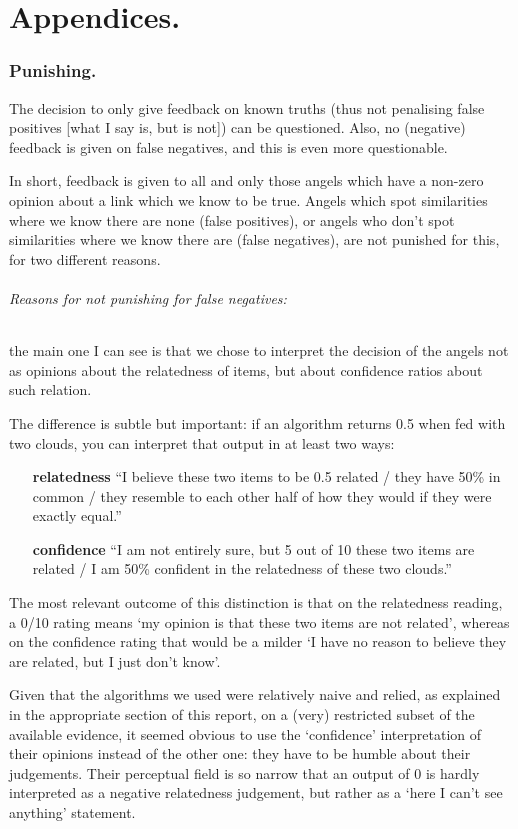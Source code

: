 \documentclass[11pt]{article}
\begin{document}
\part{Appendices.}
\section{Punishing.}

The decision to only give feedback on known truths (thus not penalising false positives [what I say is, but is not]) can be questioned. Also, no (negative) feedback is given on false negatives, and this is even more questionable.

In short, feedback is given to all and only those angels which have a non-zero opinion about a link which we know to be true. Angels which spot similarities where we know there are none (false positives), or angels who don't spot similarities where we know there are (false negatives), are not punished for this, for two different reasons.

\paragraph{Reasons for not punishing for false negatives:} the main one I can see is that we chose to interpret the decision of the angels not as opinions about the relatedness of items, but about confidence ratios about such relation.

The difference is subtle but important: if an algorithm returns 0.5 when fed with two clouds, you can interpret that output in at least two ways:

\begin{itemize}
\item[\textbf{relatedness}] ``I believe these two items to be 0.5 related / they have 50\% in common / they resemble to each other half of how they would if they were exactly equal.''
\item[\textbf{confidence}] ``I am not entirely sure, but 5 out of 10 these two items are related / I am 50\% confident in the relatedness of these two clouds.''
\end{itemize}

The most relevant outcome of this distinction is that on the relatedness reading, a 0/10 rating means `my opinion is that these two items are not related', whereas on the confidence rating that would be a milder `I have no reason to believe they are related, but I just don't know'.

Given that the algorithms we used were relatively naive and relied, as explained in the appropriate section of this report, on a (very) restricted subset of the available evidence, it seemed obvious to use the `confidence' interpretation of their opinions instead of the other one: they have to be humble about their judgements. Their perceptual field is so narrow that an output of 0 is hardly interpreted as a negative relatedness judgement, but rather as a `here I can't see anything' statement.
\end{document}
